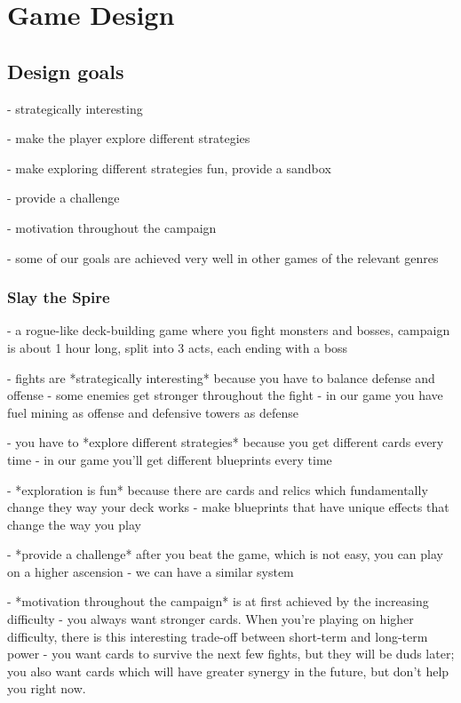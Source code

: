 \chapter{Game Design}

\section{Design goals}

- strategically interesting

- make the player explore different strategies

- make exploring different strategies fun, provide a sandbox

- provide a challenge

- motivation throughout the campaign

- some of our goals are achieved very well in other games of the relevant genres

\subsection{Slay the Spire}

- a rogue-like deck-building game where you fight monsters and bosses, campaign is about 1 hour long, split into 3 acts, each ending with a boss

- fights are *strategically interesting* because you have to balance defense and offense - some enemies get stronger throughout the fight - in our game you have fuel mining as offense and defensive towers as defense

- you have to *explore different strategies* because you get different cards every time - in our game you'll get different blueprints every time

- *exploration is fun* because there are cards and relics which fundamentally change they way your deck works - make blueprints that have unique effects that change the way you play

- *provide a challenge* after you beat the game, which is not easy, you can play on a higher ascension - we can have a similar system

- *motivation throughout the campaign* is at first achieved by the increasing difficulty - you always want stronger cards. When you're playing on higher difficulty, there is this interesting trade-off between short-term and long-term power - you want cards to survive the next few fights, but they will be duds later; you also want cards which will have greater synergy in the future, but don't help you right now.

